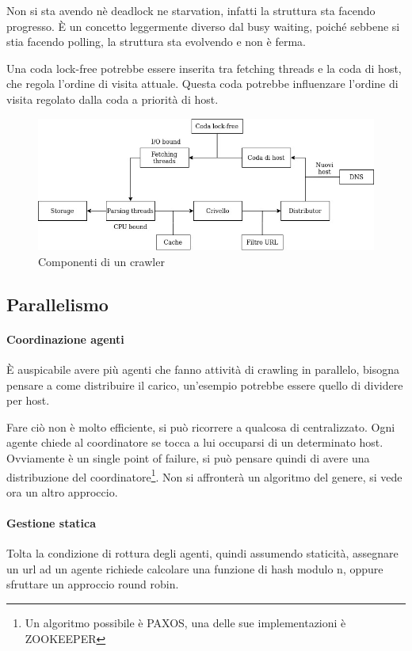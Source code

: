 Non si sta avendo nè deadlock ne starvation, infatti la struttura sta facendo progresso. 
È un concetto leggermente diverso dal busy waiting, poiché sebbene si stia facendo polling, la struttura sta evolvendo e non è ferma.

\begin{remark}
    Una coda lock-free potrebbe essere inserita tra fetching threads e la coda di host, 
    che regola l'ordine di visita attuale. Questa coda potrebbe influenzare l'ordine 
    di visita regolato dalla coda a priorità di host.
\end{remark}

\begin{figure}[h]
    \includegraphics[width=\textwidth]{images/crawling}
    \caption{Componenti di un crawler}
\end{figure}

\subsection{Parallelismo}

\paragraph{Coordinazione agenti}
È auspicabile avere più agenti che fanno attività di crawling in parallelo, 
bisogna pensare a come distribuire il carico, un'esempio potrebbe essere quello di 
dividere per host.

Fare ciò non è molto efficiente, si può ricorrere a qualcosa di centralizzato.
Ogni agente chiede al coordinatore se tocca a lui occuparsi di un determinato host. 
Ovviamente è un single point of failure, si può pensare quindi di avere una distribuzione
del coordinatore\footnote{Un algoritmo possibile è PAXOS, una delle sue implementazioni 
è ZOOKEEPER}. Non si affronterà un algoritmo del genere, si vede ora un altro approccio.

\paragraph{Gestione statica}
Tolta la condizione di rottura degli agenti, quindi assumendo staticità, assegnare 
un url ad un agente richiede calcolare una funzione di hash modulo n, oppure 
sfruttare un approccio round robin. 


